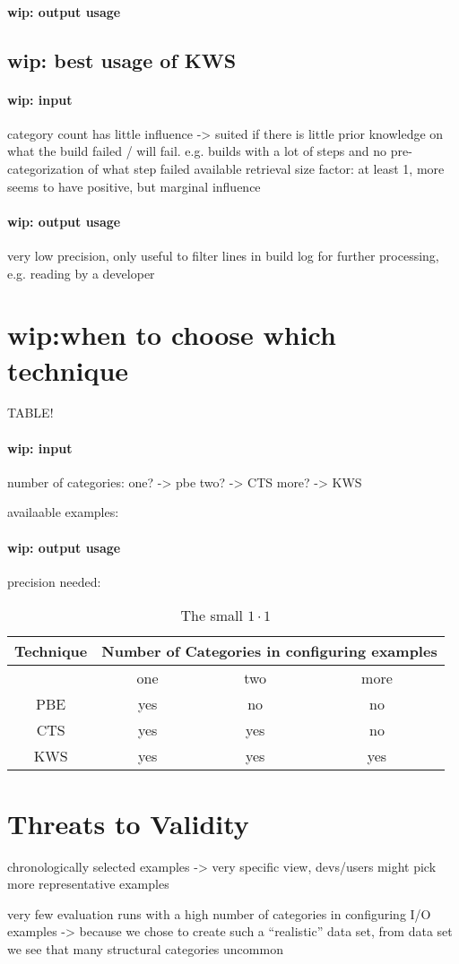 \documentclass[\myrootdir/main.tex]{subfiles}
\begin{document}
\paragraph{wip: output usage}


\subsection{wip: best usage of KWS}
\paragraph{wip: input}
category count has little influence -> suited if there is little prior knowledge on what the build failed / will fail. e.g. builds with a lot of steps and no pre-categorization of what step failed available
retrieval size factor: at least 1, more seems to have positive, but marginal influence
\paragraph{wip: output usage}
very low precision, only useful to filter lines in build log for further processing, e.g. reading by a developer

\section{wip:when to choose which technique}
TABLE!
\paragraph{wip: input}
number of categories:
one? -> pbe
two? -> CTS
more? -> KWS

availaable examples:

\paragraph{wip: output usage}
precision needed:

\begin{table}[htbp]
\begin{tabular}{ |c||c|c|c| }
  Technique & \multicolumn{3}{|c|}{Number of Categories in configuring examples} \\
  \hline
  & one & two & more \\
  PBE & yes & no & no \\ 
  CTS & yes & yes & no \\ 
  KWS & yes & yes & yes \\ 
  \hline
\end{tabular}
\caption{The small $1 \cdot 1$}
\label{tab:101}
\end{table}

\section{Threats to Validity}
chronologically selected examples -> very specific view, devs/users might pick more representative examples

very few evaluation runs with a high number of categories in configuring I/O examples -> because we chose to create such a ``realistic'' data set, from data set we see that many structural categories uncommon
\end{document}
